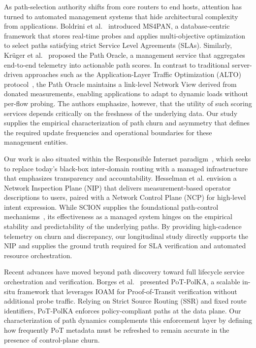\documentclass[pdflatex,sn-vancouver-num]{sn-jnl}%
\theoremstyle{thmstyleone}%
\theoremstyle{thmstyletwo}%
\theoremstyle{thmstylethree}%
\begin{document}
    As path-selection authority shifts from core routers to end hosts, attention has turned to automated management systems that hide architectural complexity from applications. Boldrini et al.~\cite{boldrini2024ms4pan} introduced MS4PAN, a database-centric framework that stores real-time probes and applies multi-objective optimization to select paths satisfying strict Service Level Agreements (SLAs). Similarly, Kr{\"u}ger et al.~\cite{kruger2023path} proposed the Path Oracle, a management service that aggregates end-to-end telemetry into actionable path scores. In contrast to traditional server-driven approaches such as the Application-Layer Traffic Optimization (ALTO) protocol~\cite{rfc7285}, the Path Oracle maintains a link-level Network View derived from donated measurements, enabling applications to adapt to dynamic loads without per-flow probing. The authors emphasize, however, that the utility of such scoring services depends critically on the freshness of the underlying data. Our study supplies the empirical characterization of path churn and asymmetry that defines the required update frequencies and operational boundaries for these management entities.
    
    Our work is also situated within the Responsible Internet paradigm~\cite{hesselman2020responsible}, which seeks to replace today's black-box inter-domain routing with a managed infrastructure that emphasizes transparency and accountability. Hesselman et al. envision a Network Inspection Plane (NIP) that delivers measurement-based operator descriptions to users, paired with a Network Control Plane (NCP) for high-level intent expression. While SCION supplies the foundational path-control mechanisms~\cite{zhang2011scion}, its effectiveness as a managed system hinges on the empirical stability and predictability of the underlying paths. By providing high-cadence telemetry on churn and discrepancy, our longitudinal study directly supports the NIP and supplies the ground truth required for SLA verification and automated resource orchestration.
    
    Recent advances have moved beyond path discovery toward full lifecycle service orchestration and verification. Borges et al.~\cite{borges2024pot} presented PoT-PolKA, a scalable in-situ framework that leverages IOAM for Proof-of-Transit verification without additional probe traffic. Relying on Strict Source Routing (SSR) and fixed route identifiers, PoT-PolKA enforces policy-compliant paths at the data plane. Our characterization of path dynamics complements this enforcement layer by defining how frequently PoT metadata must be refreshed to remain accurate in the presence of control-plane churn.
    
\end{document}

